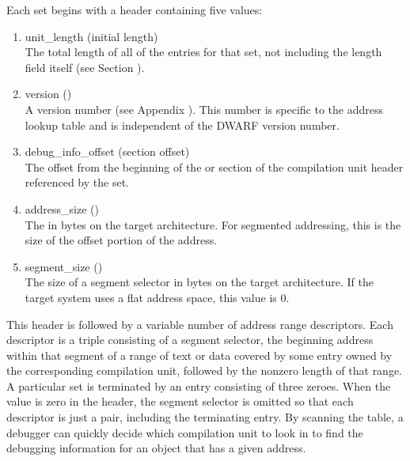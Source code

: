 Each set begins with a header containing five values:
\begin{enumerate}[1. ]
\item unit\_length (initial length) \\
The total length of all of the
entries for that set, not including the length field itself
(see Section ).

\item version () \\
A version number 
(see Appendix ). 
This number is specific to the address lookup table and is
independent of the DWARF version number.

\item debug\_info\_offset (section offset) \\
The offset from the
beginning of the  or 
 section of the
compilation unit header referenced by the set.

\item address\_size () \\
The 
in bytes on
the target architecture. For 
segmented addressing, this is
the size of the offset portion of the address.

\item segment\_size () \\
The size of a segment selector in
bytes on the target architecture. If the target system uses
a flat address space, this value is 0.

\end{enumerate}


This header is followed by a variable number of address range
descriptors. Each descriptor is a triple consisting of a
segment selector, the beginning address within that segment
of a range of text or data covered by some entry owned by
the corresponding compilation unit, followed by the non\dash zero
length of that range. A particular set is terminated by an
entry consisting of three zeroes. 
When the 
 value
is zero in the header, the segment selector is omitted so that
each descriptor is just a pair, including the terminating
entry. By scanning the table, a debugger can quickly decide
which compilation unit to look in to find the debugging
information for an object that has a given address.

